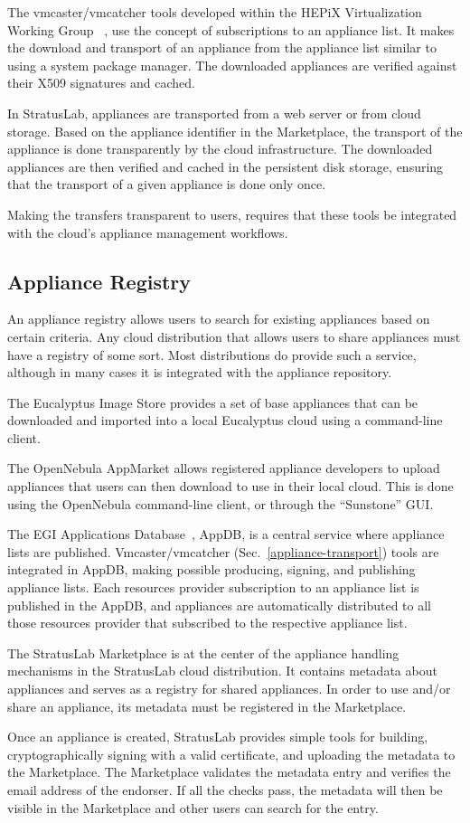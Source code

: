 The vmcaster/vmcatcher tools developed within the HEPiX Virtualization
Working Group ~\cite{hepixbooktransfer}, use the concept of
subscriptions to an appliance list. It makes the download and
transport of an appliance from the appliance list similar to using a
system package manager.  The downloaded appliances are verified
against their X509 signatures and cached.

In StratusLab, appliances are transported from a web server or from
cloud storage. Based on the appliance identifier in the Marketplace,
the transport of the appliance is done transparently by the cloud
infrastructure.  The downloaded appliances are then verified and
cached in the persistent disk storage, ensuring that the transport of
a given appliance is done only once.

Making the transfers transparent to users, requires that these tools
be integrated with the cloud's appliance management workflows.

\subsection{Appliance Registry}

An appliance registry allows users to search for existing appliances
based on certain criteria.  Any cloud distribution that allows users
to share appliances must have a registry of some sort. Most
distributions do provide such a service, although in many cases it is
integrated with the appliance repository.

The Eucalyptus Image Store provides a set of base appliances that can
be downloaded and imported into a local Eucalyptus cloud using a
command-line client.

The OpenNebula AppMarket allows registered appliance developers to
upload appliances that users can then download to use in their local
cloud. This is done using the OpenNebula command-line client, or
through the ``Sunstone'' GUI.

The EGI Applications Database~\cite{AppDB}, AppDB, is a central service
where appliance lists are published.   
Vmcaster/vmcatcher (Sec.~\ref{appliance-transport}) tools are 
integrated in AppDB, making possible producing, signing, and publishing 
appliance lists.
Each resources provider subscription to an appliance list is published
in the AppDB, and appliances are automatically distributed to all those 
resources provider that subscribed to the respective appliance list. 
 
The StratusLab Marketplace is at the center of the appliance handling
mechanisms in the StratusLab cloud distribution. It contains metadata
about appliances and serves as a registry for shared appliances.  In
order to use and/or share an appliance, its metadata must be
registered in the Marketplace\@.

Once an appliance is created, StratusLab provides simple tools for
building, cryptographically signing with a valid certificate, and
uploading the metadata to the Marketplace\@.  The Marketplace
validates the metadata entry and verifies the email address of the
endorser.  If all the checks pass, the metadata will then be visible
in the Marketplace and other users can search for the entry.
